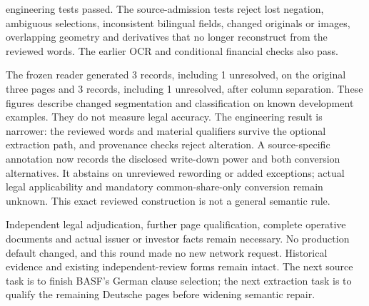 \documentclass[11pt]{article}
\begin{document}
 engineering tests passed. The source-admission tests reject lost negation,
ambiguous selections, inconsistent bilingual fields, changed originals or images,
overlapping geometry and derivatives that no longer reconstruct from the reviewed
words. The earlier OCR and conditional financial checks also pass.

The frozen reader generated 3 records, including 1 unresolved,
on the original three pages and 3 records, including 1 unresolved,
after column separation. These figures describe changed segmentation and
classification on known development examples. They do not measure legal accuracy.
The engineering result is narrower: the reviewed words and material qualifiers
survive the optional extraction path, and provenance checks reject alteration.
A source-specific annotation now records the disclosed write-down power and both
conversion alternatives. It abstains on unreviewed rewording or added exceptions;
actual legal applicability and mandatory common-share-only conversion remain
unknown. This exact reviewed construction is not a general semantic rule.

Independent legal adjudication, further page qualification, complete operative
documents and actual issuer or investor facts remain necessary. No production
default changed, and this round made no new network request. Historical evidence
and existing independent-review forms remain intact. The next source task is to
finish BASF's German clause selection; the next extraction task is to qualify
the remaining Deutsche pages before widening semantic repair.
\end{document}
